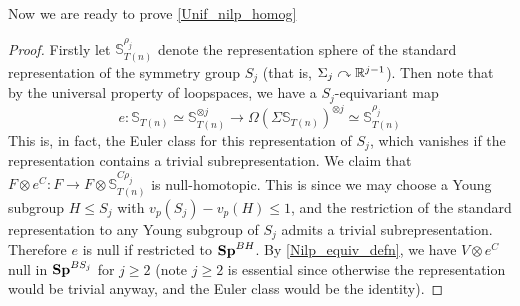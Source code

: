	Now we are ready to prove \cref{Unif_nilp_homog}
	\begin{proof}
		Firstly let $\mathbb{S}_{T(n)}^{\rho_j}$ denote the representation sphere of the standard representation of the symmetry group $S_j$ (that is, $\Sigma_j\curvearrowright\mathbb{R}^{j-1}$). Then note that by the universal property of loopspaces, we have a $S_j$-equivariant map 
		\[ e:\mathbb{S}_{T(n)}\simeq\mathbb{S}_{T(n)}^{\otimes j}\to\Omega(\Sigma\mathbb{S}_{T(n)})^{\otimes j}\simeq\mathbb{S}_{T(n)}^{\rho_j} \]
		This is, in fact, the Euler class for this representation of $S_j$, which vanishes if the representation contains a trivial subrepresentation. We claim that $F\otimes e^C:F\to F\otimes\mathbb{S}_{T(n)}^{C\rho_j}$ is null-homotopic. This is since we may choose a Young subgroup $H\leq S_j$ with $v_p(S_j)-v_p(H)\leq 1$, and the restriction of the standard representation to any Young subgroup of $S_j$ admits a trivial subrepresentation. Therefore $e$ is null if restricted to $\mathbf{Sp}^{BH}$. By \cref{Nilp_equiv_defn}, we have $V\otimes e^C$ null in $\mathbf{Sp}^{BS_j}$ for $j\geq2$ (note $j\geq2$ is essential since otherwise the representation would be trivial anyway, and the Euler class would be the identity). 


\end{proof}
